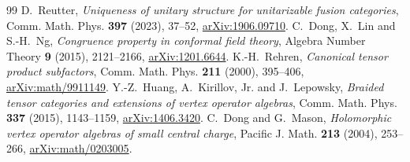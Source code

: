 \begin{thebibliography}{99}
D.~Reutter, \emph{Uniqueness of unitary structure for unitarizable fusion
categories}, Comm. Math. Phys. \textbf{397} (2023), 37--52,
\href{https://arxiv.org/abs/1906.09710}{arXiv:1906.09710}.
C.~Dong, X.~Lin and S.-H.~Ng, \emph{Congruence property in conformal field
theory}, Algebra Number Theory \textbf{9} (2015), 2121--2166,
\href{https://arxiv.org/abs/1201.6644}{arXiv:1201.6644}.
K.-H.~Rehren, \emph{Canonical tensor product subfactors}, Comm. Math. Phys.
\textbf{211} (2000), 395--406,
\href{https://arxiv.org/abs/math/9911149}{arXiv:math/9911149}.
Y.-Z.~Huang, A.~Kirillov, Jr. and J.~Lepowsky, \emph{Braided tensor
categories and extensions of vertex operator algebras}, Comm. Math. Phys.
\textbf{337} (2015), 1143--1159,
\href{https://arxiv.org/abs/1406.3420}{arXiv:1406.3420}.
C.~Dong and G.~Mason, \emph{Holomorphic vertex operator algebras of small
central charge}, Pacific J. Math. \textbf{213} (2004), 253--266,
\href{https://arxiv.org/abs/math/0203005}{arXiv:math/0203005}.
\end{thebibliography}
